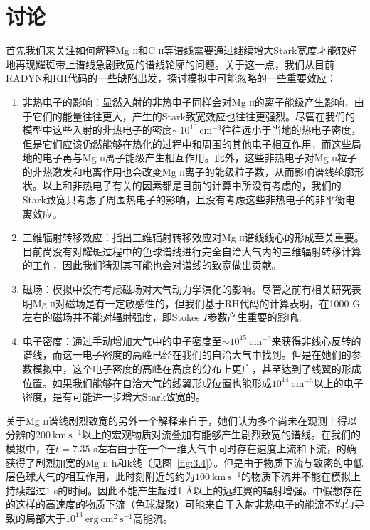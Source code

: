 \section{讨论}\label{sec:3.8}
首先我们来关注如何解释Mg \textsc{ii}和C \textsc{ii}等谱线需要通过继续增大Stark宽度才能较好地再现耀斑带上谱线急剧致宽的谱线轮廓的问题。关于这一点，我们从目前RADYN和RH代码的一些缺陷出发，探讨模拟中可能忽略的一些重要效应：
\begin{enumerate}
	\item 非热电子的影响：显然入射的非热电子同样会对Mg \textsc{ii}的离子能级产生影响\parencites{Hawley2007}，由于它们的能量往往更大，产生的Stark致宽效应也往往更强烈。尽管在我们的模型中这些入射的非热电子的密度$\sim10^{10}\ \mathrm{cm^{-3}}$往往远小于当地的热电子密度，但是它们应该仍然能够在热化的过程中和周围的其他电子相互作用，而这些局地的电子再与Mg \textsc{ii}离子能级产生相互作用。此外，这些非热电子对Mg \textsc{ii}粒子的非热激发和电离作用也会改变Mg \textsc{ii}离子的能级粒子数，从而影响谱线轮廓形状。以上和非热电子有关的因素都是目前的计算中所没有考虑的，我们的Stark致宽只考虑了周围热电子的影响，且没有考虑这些非热电子的非平衡电离效应。
	\item 三维辐射转移效应：\textcites{Leenaarts2013a}指出三维辐射转移效应对Mg \textsc{ii}谱线线心的形成至关重要。目前尚没有对耀斑过程中的色球谱线进行完全自洽大气内的三维辐射转移计算的工作，因此我们猜测其可能也会对谱线的致宽做出贡献。
	\item 磁场：模拟中没有考虑磁场对大气动力学演化的影响。尽管之前有相关研究表明Mg \textsc{ii}对磁场是有一定敏感性的\parencites{Ballester2016}，但我们基于RH代码的计算表明，在1000 G左右的磁场并不能对辐射强度，即Stokes $I$参数产生重要的影响。
	\item 电子密度：\textcites{Rubio2017}通过手动增加大气中的电子密度至$\sim 10^{15}\ \mathrm{cm}^{-3}$来获得非线心反转的谱线，而这一电子密度的高峰已经在我们的自洽大气中找到。但是在她们的参数模拟中，这个电子密度的高峰在高度的分布上更广，甚至达到了线翼的形成位置。如果我们能够在自洽大气的线翼形成位置也能形成$10^{14}\ \mathrm{cm^{-3}}$以上的电子密度，是有可能进一步增大Stark致宽的。
\end{enumerate}

关于Mg \textsc{ii}谱线剧烈致宽的另外一个解释来自于\textcites{Rubio2017}，她们认为多个尚未在观测上得以分辨的$200\ \mathrm{km\  s^{-1}}$以上的宏观物质对流叠加有能够产生剧烈致宽的谱线。在我们的模拟中，在$t=7.35$ s左右由于在一个一维大气中同时存在速度上流和下流，的确获得了剧烈加宽的Mg \textsc{ii} h和k线（见图~\ref{fig:3.4}）。但是由于物质下流与致密的中低层色球大气的相互作用，此时刻附近的约为$100\ \mathrm{km \  s^{-1}}$的物质下流并不能在模拟上持续超过$1$ s的时间。因此不能产生超过1 \mbox{\AA}以上的远红翼的辐射增强。\textcites{Rubio2017}中假想存在的这样的高速度的物质下流（色球凝聚）可能来自于入射非热电子的能流不均匀导致的局部大于$10^{13}\ \mathrm{erg\  cm^2\  s^{-1}}$高能流\parencites{Kowalski2015,Kowalski2018a}。


